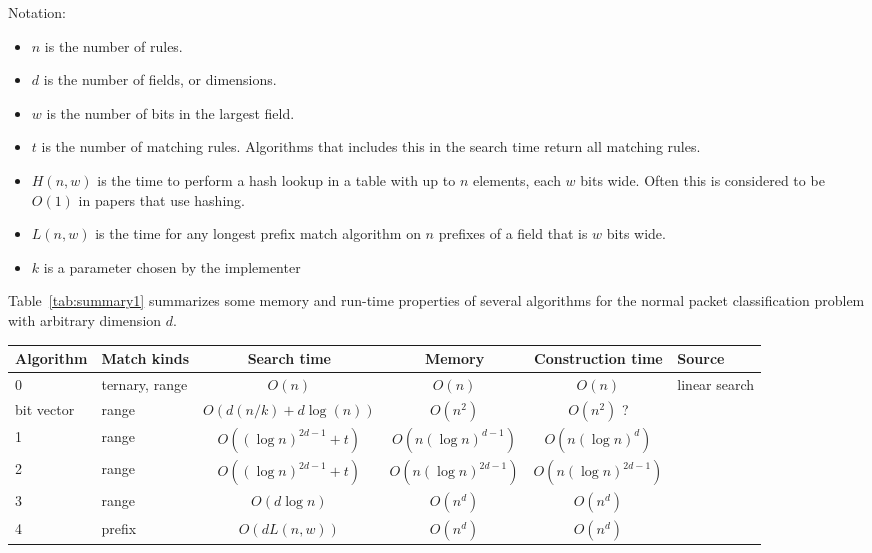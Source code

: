 \documentclass[acmsmall]{acmart}
\begin{document}
Notation:
\begin{itemize}
  \item $n$ is the number of rules.
  \item $d$ is the number of fields, or dimensions.
  \item $w$ is the number of bits in the largest field.
  \item $t$ is the number of matching rules.  Algorithms that includes this in the search time return all matching rules.
  \item $H(n,w)$ is the time to perform a hash lookup in a table with up to $n$ elements, each $w$ bits wide.  Often this is considered to be $O(1)$ in papers that use hashing.
  \item $L(n,w)$ is the time for any longest prefix match algorithm on $n$ prefixes of a field that is $w$ bits wide.
  \item $k$ is a parameter chosen by the implementer
\end{itemize}

Table~\ref{tab:summary1} summarizes some memory and run-time properties of several algorithms for the normal packet classification problem with arbitrary dimension $d$.

\begin{table*}
  \caption{Algorithms for normal packet classification problem}
  \label{tab:summary1}
  \begin{tabular}{llcccl}
    \toprule
    
      Algorithm
    & Match kinds
    & Search time
    & Memory
    & Construction time
    & Source \\
    
    \midrule

      0
    & ternary, range
    & $O(n)$
    & $O(n)$
    & $O(n)$
    & linear search
    \\

      bit vector
    & range
    & $O(d(n/k) + d \log(n))$
    & $O(n^2)$
    & $O(n^2)$ ?
    & \cite[Sec. 4]{LS1998}
    \\

      1
    & range
    & $O((\log n)^{2d-1} + t)$
    & $O(n (\log n)^{d-1} )$
    & $O(n (\log n)^d )$
    & \cite[Thm. 3.2]{Edel1983a}
    \\

      2
    & range
    & $O((\log n)^{2d-1} + t)$
    & $O(n (\log n)^{2d-1} )$
    & $O(n (\log n)^{2d-1} )$
    & \cite[Cor. 2.2]{Edel1983a}
    \\

      3
    & range
    & $O(d \log n)$
    & $O(n^d)$
    & $O(n^d)$
    & \cite[Sec. 2.3]{PS1985}
    \\

      4
    & prefix
    & $O(d L(n,w))$
    & $O(n^d)$
    & $O(n^d)$
    & \cite[Sec. 2.3]{PS1985}
    \\

  \bottomrule
\end{tabular}
\end{table*}
\end{document}
